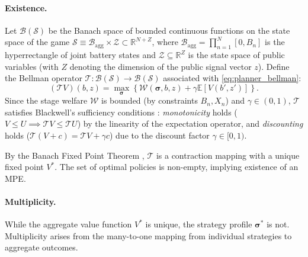 \documentclass[12pt, notitlepage]{article}
\begin{document}
\paragraph{Existence.}
Let $\mathcal{B}(\mathcal{S})$ be the Banach space of bounded continuous functions on the state space of the game $\mathcal{S} \equiv \mathcal{B}_{\text{agg}} \times \mathcal{Z} \subset \mathbb{R}^{N + Z}$, where 
$\mathcal{B}_{\text{agg}} = \prod_{n=1}^N [0, B_n]$ is the hyperrectangle of joint battery states and $\mathcal{Z} \subseteq \mathbb{R}^Z$ is the state space of public variables (with $Z$ denoting the dimension of the public signal vector $z$).
Define the Bellman operator $\mathcal{T}: \mathcal{B}(\mathcal{S}) \to \mathcal{B}(\mathcal{S})$ associated with \eqref{eq:planner_bellman}:
\[
    (\mathcal{T}V)(b, z) = \max_{\boldsymbol{\sigma}} \left\{ \mathcal{W}(\boldsymbol{\sigma}, b, z) + \gamma \mathbb{E}[V(b', z')] \right\}.
\]
Since the stage welfare $\mathcal{W}$ is bounded (by constraints $B_n, X_n$) and $\gamma \in (0,1)$, $\mathcal{T}$ satisfies Blackwell’s sufficiency conditions \citep{blackwell1965}: \textit{monotonicity} holds ($V \le U \implies \mathcal{T}V \le \mathcal{T}U$) by the linearity of the expectation operator, and \textit{discounting} holds ($\mathcal{T}(V+c) = \mathcal{T}V + \gamma c$) due to the discount factor $\gamma \in [0,1)$. 

By the Banach Fixed Point Theorem \citep{banach1922}, $\mathcal{T}$ is a contraction mapping with a unique fixed point $V^*$. The set of optimal policies is non-empty, implying existence of an MPE.


\paragraph{Multiplicity.}
While the aggregate value function $V^*$ is unique, the strategy profile $\boldsymbol{\sigma}^*$ is not. Multiplicity arises from the many-to-one mapping from individual strategies to aggregate outcomes. 
\end{document}
